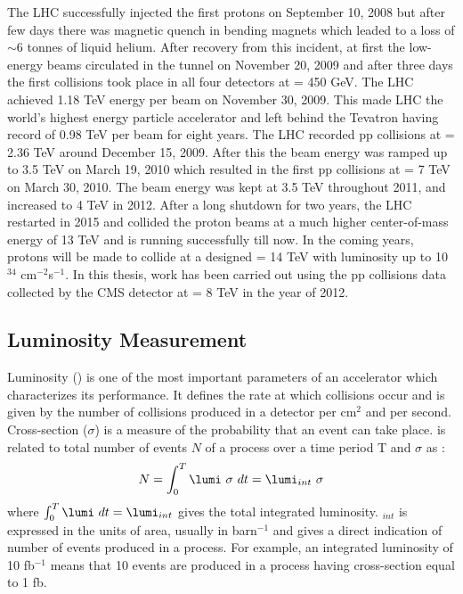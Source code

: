 The LHC successfully injected the first protons on September 10, 2008 but after few days there was magnetic quench in bending magnets which leaded to a loss of $\sim$6 tonnes of liquid helium. After recovery from this incident, at first the low-energy beams circulated in the tunnel on November 20, 2009 and after three days the first collisions took place in all four detectors at \cme = 450 GeV. The LHC achieved 1.18 TeV energy per beam on November 30, 2009. This made LHC the world’s highest energy particle accelerator and left behind the Tevatron having record of 0.98 TeV per beam for eight years. The LHC recorded pp collisions at \cme = 2.36 TeV around December 15, 2009. After this the beam energy was ramped up to 3.5 TeV on March 19, 2010 which resulted in the first pp collisions at \cme = 7 TeV on March 30, 2010. The beam energy was kept at 3.5 TeV throughout 2011, and increased to 4 TeV in 2012. After a long shutdown for two years, the LHC restarted in 2015 and collided the proton beams at a much higher center-of-mass energy of 13 TeV and is running successfully till now. In the coming years, protons will be made to collide at a designed \cme = 14 TeV with luminosity up to 10$^{34}$ cm$^{-2}$s$^{-1}$. In this thesis, work has been carried out using the pp collisions data collected by the CMS detector at \cme = 8 TeV in the year of 2012.

\subsection{Luminosity Measurement}
\label{sec:lumi}
Luminosity (\lumi) is one of the most important parameters of an accelerator which characterizes its performance. It defines the rate at which collisions occur and is given by the number of collisions produced in a detector per cm$^2$ and per second. Cross-section ($\sigma$) is a measure of the probability that an event can take place. \lumi is related to total number of events $N$ of a process over a time period T and $\sigma$ as :
\begin{equation}
N = \int_{0}^{T} \lumi~\sigma~dt = \lumi_{int}~\sigma
\end{equation}
where $\int_{0}^{T} \lumi~dt = \lumi_{int}$ gives the total integrated luminosity. \lumi$_{int}$ is expressed in the units of area, usually in barn$^{-1}$ and gives a direct indication of number of events produced in a process. For example, an integrated luminosity of 10 fb$^{-1}$ means that 10 events are produced in a process having cross-section equal to 1 fb.

